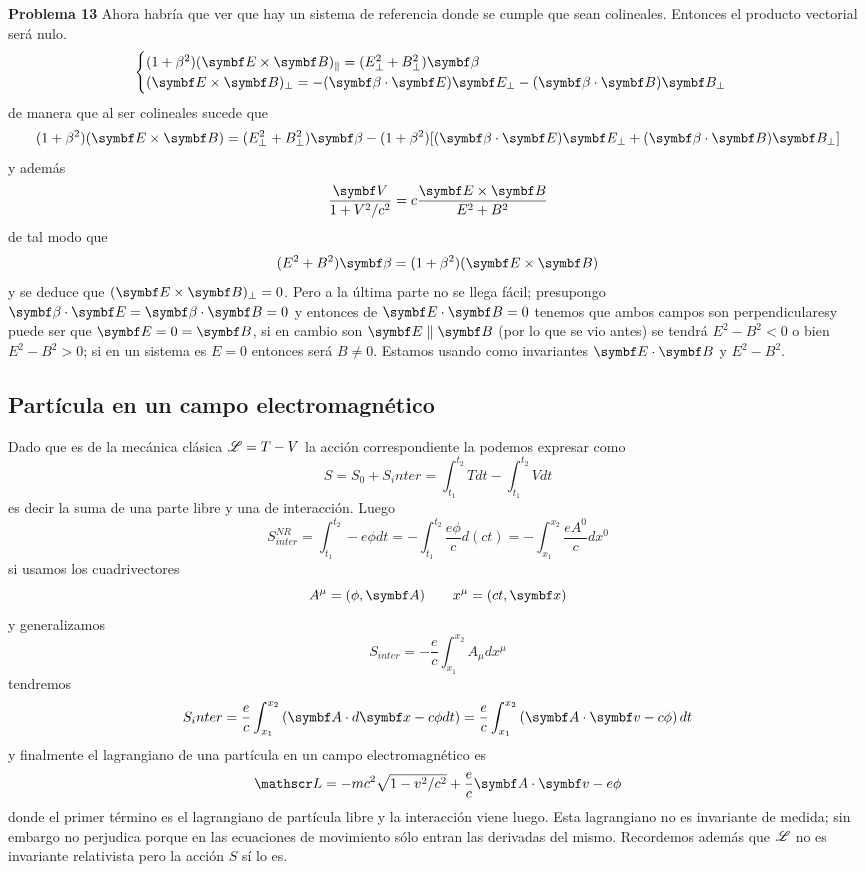 \documentclass[10pt,oneside]{CBFT_book}
\begin{document}
\begin{ejemplo}{\bf Problema 13}
Ahora habría que ver que hay un sistema de referencia donde se cumple que sean colineales.
Entonces el producto vectorial será nulo.
\[
	\begin{cases}
	( 1 + \beta^2 ) (\pv{E}{B})_\parallel = ( E^2_\perp + B^2_\perp ) \vb{\beta} \\
	(\pv{E}{B})_\perp = -(\pe{\beta}{E}) \vb{E}_\perp - (\pe{\beta}{B}) \vb{B}_\perp
	\end{cases}
\]
de manera que al ser colineales sucede que
\[
	( 1 + \beta^2 ) (\pv{E}{B}) = ( E^2_\perp + B^2_\perp ) \vb{\beta}  -
	( 1 + \beta^2 ) [ (\pe{\beta}{E}) \vb{E}_\perp + (\pe{\beta}{B}) \vb{B}_\perp ]
\]
y además
\[
	\frac{\vb{V}}{1 + V^2/c^2} = c \frac{\pv{E}{B}}{E^2+B^2}
\]
de tal modo que 
\[
	( E^2 + B^2 )\vb{\beta} = ( 1 + \beta^2 )( \pv{E}{B} )
\]
y se deduce que $ ( \pv{E}{B} )_\perp = 0 $.
Pero a la última parte no se llega fácil; presupongo $\pe{\beta}{E} = \pe{\beta}{B} = 0$
y entonces de $\pe{E}{B} = 0$ tenemos que ambos campos son perpendicularesy puede ser que
$\vb{E}= 0 = \vb{B}$, si en cambio son $\vb{E} \parallel \vb{B}$ (por lo que se vio antes) 
se tendrá $E^2 - B^2 < 0$ o bien $E^2 - B^2 > 0$; si en un sistema es $E=0$ entonces será
$B\neq 0$.
Estamos usando como invariantes $\pe{E}{B}$ y $E^2-B^2$.

 
\end{ejemplo}



\subsection{Partícula en un campo electromagnético}

Dado que es de la mecánica clásica $\mathscr{L} = T - V$ la acción correspondiente la podemos expresar  como 
\[
	S = S_0 + S_inter = \int_{t_1}^{t_2} T dt - \int_{t_1}^{t_2} V dt
\]
es decir la suma de una parte libre y una de interacción. Luego 
\[
	S_{inter}^{NR} = \int_{t_1}^{t_2} -e \phi dt =  -\int_{t_1}^{t_2} \frac{ e \phi }{c} d(ct) = 
		-\int_{x_1}^{x_2} \frac{ e A^0 }{c} dx^0
\]
si usamos los cuadrivectores 
\[
	A^\mu = ( \phi, \vb{A} ) \qquad x^\mu = ( ct, \vb{x} ) 
\]
y generalizamos 
\[
	S_{inter} = - \frac{e}{c} \int_{x_1}^{x_2} A_\mu dx^\mu
\]
tendremos 
\[
	S_inter = \frac{e}{c} \int_{x_1}^{x_2} \left( \vb{A}\cdot d\vb{x} - c \phi dt \right) = 
		\frac{e}{c} \int_{x_1}^{x_2} \left( \vb{A}\cdot\vb{v} - c \phi \right) dt
\]
y finalmente el lagrangiano de una partícula en un campo electromagnético es 
\[
	\Lag = - m c^2 \sqrt{ 1 - v^2/c^2 } + \frac{e}{c} \pe{A}{v} - e \phi
\]
donde el primer término es el lagrangiano de partícula libre y la interacción viene luego. Esta lagrangiano 
no es invariante de medida; sin embargo no perjudica porque en las ecuaciones de movimiento sólo entran las
derivadas del mismo. Recordemos además que $\mathscr{L}$ no es invariante relativista pero la acción $S$ sí lo es.
\end{document}
